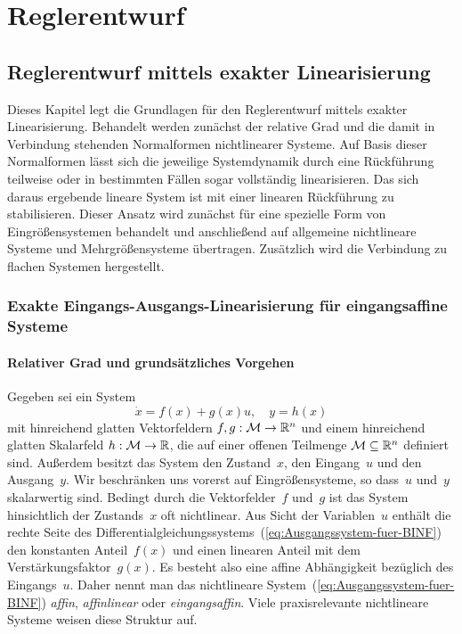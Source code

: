 
\part{Reglerentwurf\label{part:Reglerentwurf}}

\chapter{Reglerentwurf mittels exakter Linearisierung\label{chap:regler-grundlagen}}

Dieses Kapitel legt die Grundlagen für den Reglerentwurf mittels exakter
Linearisierung. Behandelt werden zunächst der relative Grad und die
damit in Verbindung stehenden Normalformen nichtlinearer Systeme.
Auf Basis dieser Normalformen lässt sich die jeweilige Systemdynamik
durch eine Rückführung teilweise oder in bestimmten Fällen sogar vollständig
linearisieren. Das sich daraus ergebende lineare System ist mit einer
linearen Rückführung zu stabilisieren. Dieser Ansatz wird zunächst
für eine spezielle Form von Eingrößensystemen behandelt und anschließend
auf allgemeine nichtlineare Systeme und Mehrgrößensysteme übertragen.
Zusätzlich wird die Verbindung zu flachen Systemen hergestellt.

\section{Exakte Eingangs-Ausgangs-Linearisierung für eingangsaffine Systeme\label{sec:E-A-Linearisierung-affin}}

\subsection{Relativer Grad und grundsätzliches Vorgehen\label{subsec:Relativer-Grad-grundlegendes-Vorgehen}}

Gegeben sei ein System 
\begin{equation}
\dot{x}=f(x)+g(x)u,\quad y=h(x)\label{eq:Ausgangssystem-fuer-BINF}
\end{equation}
mit hinreichend glatten Vektorfeldern $f,g:\mathcal{M}\to{\mathbb{R}}^{n}$
und einem hinreichend glatten Skalarfeld $h:\mathcal{M}\to{\mathbb{R}}$, die
auf einer offenen Teilmenge $\mathcal{M}\subseteq{\mathbb{R}}^{n}$ definiert
sind. Außerdem besitzt das System den Zustand~$x$, den Eingang~$u$
und den Ausgang~$y$. Wir beschränken uns vorerst auf Eingrößensysteme,
so dass~$u$ und~$y$ skalarwertig sind. Bedingt durch die Vektorfelder~$f$
und~$g$ ist das System hinsichtlich der Zustands~$x$ oft nichtlinear.
Aus Sicht der Variablen~$u$ enthält die rechte Seite des Differentialgleichungssystems~(\ref{eq:Ausgangssystem-fuer-BINF})
den konstanten Anteil~$f(x)$ und einen linearen Anteil mit dem Verstärkungsfaktor~$g(x)$.
Es besteht also eine affine Abhängigkeit bezüglich des Eingangs~$u$.
Daher nennt man das nichtlineare System~(\ref{eq:Ausgangssystem-fuer-BINF})
\emph{affin}, \emph{affinlinear} oder \emph{eingangsaffin}. Viele
praxisrelevante nichtlineare Systeme weisen diese Struktur auf.

